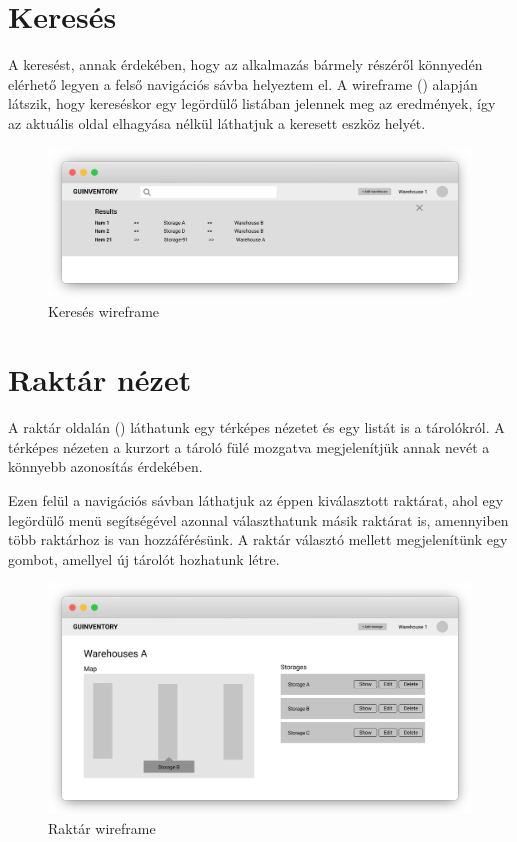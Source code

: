 \section{Keresés}
A keresést, annak érdekében, hogy az alkalmazás bármely részéről könnyedén elérhető legyen a felső navigációs sávba helyeztem el.
A wireframe () alapján látszik, hogy kereséskor egy legördülő listában jelennek meg az eredmények, így az aktuális oldal elhagyása nélkül láthatjuk a keresett eszköz helyét.
\begin{figure}[!ht]
  \centering
  \includegraphics[width=150mm, keepaspectratio]{figures/wireframes/search.png}
  \caption{Keresés wireframe}
  \label{fig:SearchWireframe}
\end{figure}


\section{Raktár nézet}
A raktár oldalán () láthatunk egy térképes nézetet és egy listát is a tárolókról. 
A térképes nézeten a kurzort a tároló fülé mozgatva megjelenítjük annak nevét a könnyebb azonosítás érdekében.

Ezen felül a navigációs sávban láthatjuk az éppen kiválasztott raktárat, ahol egy legördülő menü segítségével azonnal választhatunk másik raktárat is, amennyiben több raktárhoz is van hozzáférésünk.
A raktár választó mellett megjelenítünk egy gombot, amellyel új tárolót hozhatunk létre.
\begin{figure}[!ht]
  \centering
  \includegraphics[width=150mm, keepaspectratio]{figures/wireframes/frame_warehouse.png}
  \caption{Raktár wireframe}
  \label{fig:WarehouseWireframe}
\end{figure}

